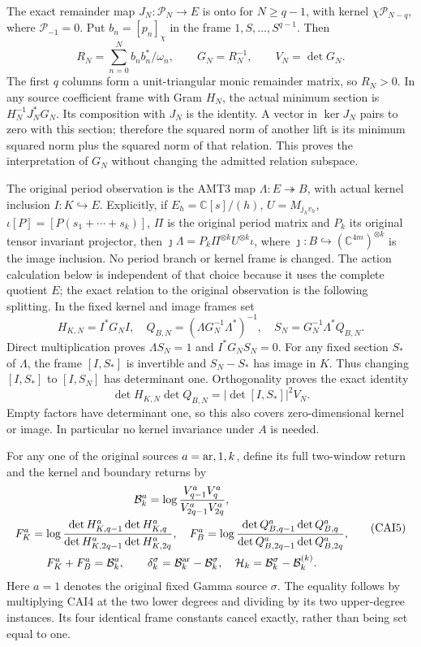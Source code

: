 \documentclass[11pt,a4paper]{article}
\begin{document}
The exact remainder map $J_N:\mathcal P_N\to E$ is onto for
$N\ge q-1$, with kernel $\chi\mathcal P_{N-q}$, where
$\mathcal P_{-1}=0$. Put $b_n=[p_n]_\chi$ in the frame
$1,S,\ldots,S^{q-1}$. Then
\[
 R_N=\sum_{n=0}^N b_nb_n^*/\omega_n,\qquad
 G_N=R_N^{-1},\qquad V_N=\det G_N.\tag{CAI2}
\]
The first $q$ columns form a unit-triangular monic remainder matrix, so
$R_N>0$. In any source coefficient frame with Gram $H_N$, the actual
minimum section is $H_N^{-1}J_N^*G_N$. Its composition with $J_N$ is the
identity. A vector in $\ker J_N$ pairs to zero with this section;
therefore the squared norm of another lift is its minimum squared norm
plus the squared norm of that relation. This proves the interpretation
of $G_N$ without changing the admitted relation subspace.

The original period observation is the AMT3 map
$\Lambda:E\twoheadrightarrow B$, with actual kernel inclusion
$I:K\hookrightarrow E$. Explicitly, if $E_h=\mathbb C[s]/(h)$,
$U=M_{j_hv_h}$, $\iota[P]=[P(s_1+\cdots+s_k)]$, $\Pi$ is the original
period matrix and $P_k$ its original tensor invariant projector, then
$\jmath\Lambda=P_k\Pi^{\otimes k}U^{\otimes k}\iota$, where
$\jmath:B\hookrightarrow(\mathbb C^{4m})^{\otimes k}$ is the image
inclusion. No period branch or kernel frame is changed. The action
calculation below is independent of that choice because it uses the
complete quotient $E$; the exact relation to the original observation
is the following splitting. In the fixed kernel and image frames set
\[
 H_{K,N}=I^*G_NI,\quad
 Q_{B,N}=(\Lambda G_N^{-1}\Lambda^*)^{-1},\quad
 S_N=G_N^{-1}\Lambda^*Q_{B,N}.\tag{CAI3}
\]
Direct multiplication proves $\Lambda S_N=1$ and $I^*G_NS_N=0$.
For any fixed section $S_*$ of $\Lambda$, the frame $[I,S_*]$ is
invertible and $S_N-S_*$ has image in $K$. Thus changing $[I,S_*]$ to
$[I,S_N]$ has determinant one. Orthogonality proves the exact identity
\[
 \det H_{K,N}\det Q_{B,N}=|\det[I,S_*]|^2V_N.\tag{CAI4}
\]
Empty factors have determinant one, so this also covers zero-dimensional
kernel or image. In particular no kernel invariance under $A$ is needed.

For any one of the original sources $a={\rm ar},1,k$, define its full
two-window return and the kernel and boundary returns by
\[
\begin{gathered}
 \mathcal B_k^a=\log\frac{V_{q-1}^aV_q^a}{V_{2q-1}^aV_{2q}^a},\\
 F_K^a=\log\frac{\det H_{K,q-1}^a\det H_{K,q}^a}
                       {\det H_{K,2q-1}^a\det H_{K,2q}^a},\quad
 F_B^a=\log\frac{\det Q_{B,q-1}^a\det Q_{B,q}^a}
                       {\det Q_{B,2q-1}^a\det Q_{B,2q}^a},\\
 F_K^a+F_B^a=\mathcal B_k^a,\qquad
 \delta_k^\sigma=\mathcal B_k^{\rm ar}-\mathcal B_k^\sigma,\quad
 \mathcal H_k=\mathcal B_k^\sigma-\mathcal B_k^{(k)}.
\end{gathered}\tag{CAI5}
\]
Here $a=1$ denotes the original fixed Gamma source $\sigma$.
The equality follows by multiplying CAI4 at the two lower degrees and
dividing by its two upper-degree instances. Its four identical frame
constants cancel exactly, rather than being set equal to one.
\end{document}
